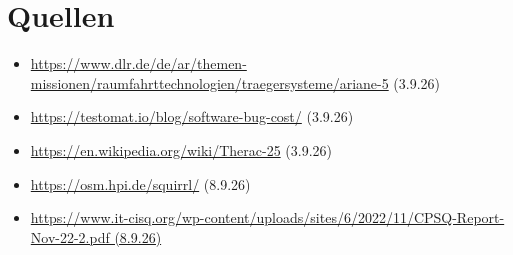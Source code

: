 \documentclass[10pt]{beamer}
\begin{document}
	\section*{Quellen}
	\begin{frame}
		\begin{itemize}
			\item \url{https://www.dlr.de/de/ar/themen-missionen/raumfahrttechnologien/traegersysteme/ariane-5} (3.9.26)
			\item \url{https://testomat.io/blog/software-bug-cost/} (3.9.26)
			\item \url{https://en.wikipedia.org/wiki/Therac-25} (3.9.26)
			\item \url{https://osm.hpi.de/squirrl/} (8.9.26)
			\item \url{https://www.it-cisq.org/wp-content/uploads/sites/6/2022/11/CPSQ-Report-Nov-22-2.pdf (8.9.26)}
		\end{itemize}
	\end{frame}
\end{document}
